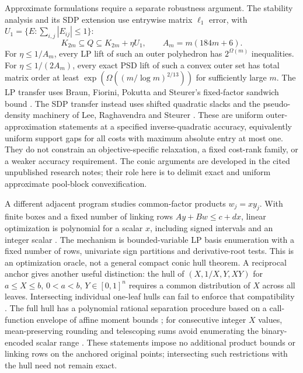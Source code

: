 Approximate formulations require a separate robustness argument.
The stability analysis \cite{s6:stability-note} and its SDP extension
\cite{s6:approx-sdp-note} use entrywise matrix $\ell_1$ error, with
$U_1=\{E:\sum_{i,j}|E_{ij}|\le1\}$:
\[
 K_{2m}\subseteq Q\subseteq K_{2m}+\eta U_1,
 \qquad A_m=m(184m+6).
\]
For $\eta\le1/A_m$, every LP lift of such an outer polyhedron has
$2^{\Omega(m)}$ inequalities. For $\eta\le1/(2A_m)$, every exact
PSD lift of such a convex outer set has total matrix order at least
$\exp(\Omega((m/\log m)^{2/13}))$ for sufficiently large $m$.
The LP transfer uses Braun, Fiorini, Pokutta and Steurer's fixed-factor
sandwich bound \cite[Theorem~6]{s6:bfps2015}. The SDP transfer instead
uses shifted quadratic slacks and the pseudo-density machinery of
Lee, Raghavendra and Steurer
\cite[Theorem~3.8, equation~(3.11), and Theorem~5.3]{s6:lrs-full}. These are uniform outer-approximation
statements at a specified inverse-quadratic accuracy, equivalently
uniform support gaps for all costs with maximum absolute entry at most
one. They do not constrain an objective-specific relaxation, a fixed
cost-rank family, or a weaker accuracy requirement. The conic arguments
are developed in the cited unpublished research notes; their role here
is to delimit exact and uniform approximate pool-block convexification.

A different adjacent program studies common-factor products $w_j=xy_j$.
With finite boxes and a fixed number of linking rows
$Ay+Bw\le c+dx$, linear optimization is polynomial for a scalar $x$,
including signed intervals and an integer scalar
\cite{s6:common-factor-note}. The mechanism is bounded-variable LP
basis enumeration with a fixed number of rows, univariate sign
partitions and derivative-root tests. This is an optimization oracle,
not a general compact conic hull theorem. A reciprocal anchor gives
another useful distinction: the hull of
$(X,1/X,Y,XY)$ for $a\le X\le b$, $0<a<b$, $Y\in[0,1]^n$
requires a common distribution of $X$ across all leaves.
Intersecting individual one-leaf hulls can fail to enforce that
compatibility \cite{s6:anchor-faces-note}. The full hull has a
polynomial rational separation procedure based on a call-function
envelope of affine moment bounds \cite{s6:anchor-full-note}; for consecutive integer
$X$ values, mean-preserving rounding and telescoping sums avoid
enumerating the binary-encoded scalar range
\cite{s6:integer-anchor-note}. These statements impose no additional
product bounds or linking rows on the anchored original points;
intersecting such restrictions with the hull need not remain exact.

